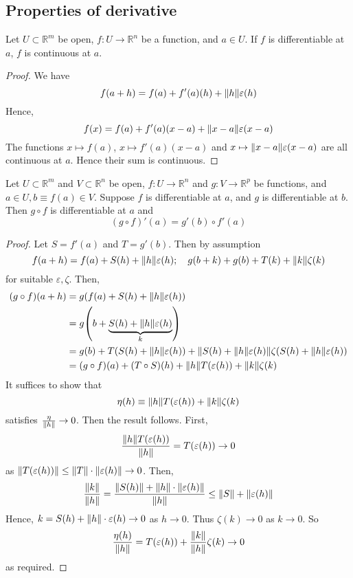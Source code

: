 \subsection{Properties of derivative}
\begin{proposition}
	Let \( U \subset \mathbb R^m \) be open, \( f \colon U \to \mathbb R^n \) be a function, and \( a \in U \).
	If \( f \) is differentiable at \( a \), \( f \) is continuous at \( a \).
\end{proposition}
\begin{proof}
	We have
	\[
		f(a+h) = f(a) + f'(a)(h) + \norm{h} \varepsilon(h)
	\]
	Hence,
	\[
		f(x) = f(a) + f'(a)(x-a) + \norm{x-a} \varepsilon(x-a)
	\]
	The functions \( x \mapsto f(a) \), \( x \mapsto f'(a)(x-a) \) and \( x \mapsto \norm{x-a}\varepsilon(x-a) \) are all continuous at \( a \).
	Hence their sum is continuous.
\end{proof}
\begin{proposition}
	Let \( U \subset \mathbb R^m \) and \( V \subset \mathbb R^n \) be open, \( f \colon U \to \mathbb R^n \) and \( g \colon V \to \mathbb R^p \) be functions, and \( a \in U, b \equiv f(a) \in V \).
	Suppose \( f \) is differentiable at \( a \), and \( g \) is differentiable at \( b \).
	Then \( g \circ f \) is differentiable at \( a \) and
	\[
		(g \circ f)'(a) = g'(b) \circ f'(a)
	\]
\end{proposition}
\begin{proof}
	Let \( S = f'(a) \) and \( T = g'(b) \).
	Then by assumption
	\[
		f(a+h) = f(a) + S(h) + \norm{h} \varepsilon(h);\quad g(b+k) + g(b) + T(k) + \norm{k} \zeta(k)
	\]
	for suitable \( \varepsilon, \zeta \).
	Then,
	\begin{align*}
		(g \circ f)(a+h) & = g\qty(f(a) + S(h) + \norm{h} \varepsilon(h))                                                                               \\
		                 & = g\qty(b + \underbrace{S(h) + \norm{h} \varepsilon(h)}_{k})                                                                 \\
		                 & = g(b) + T\qty(S(h) + \norm{h} \varepsilon(h)) + \norm{S(h) + \norm{h} \varepsilon(h)} \zeta(S(h) + \norm{h} \varepsilon(h)) \\
		                 & = (g \circ f)(a) + (T \circ S)(h) + \norm{h} T(\varepsilon(h)) + \norm{k} \zeta(k)
	\end{align*}
	It suffices to show that
	\[
		\eta(h) \equiv \norm{h} T(\varepsilon(h)) + \norm{k} \zeta(k)
	\]
	satisfies \( \frac{\eta}{\norm{h}} \to 0 \).
	Then the result follows.
	First,
	\[
		\frac{\norm{h}T(\varepsilon(h))}{\norm{h}} = T(\varepsilon(h)) \to 0
	\]
	as \( \norm{T(\varepsilon(h))} \leq \norm{T} \cdot \norm{\varepsilon(h)} \to 0 \).
	Then,
	\[
		\frac{\norm{k}}{\norm{h}} = \frac{\norm{S(h)} + \norm{h} \cdot \norm{\varepsilon(h)}}{\norm{h}} \leq \norm{S} + \norm{\varepsilon(h)}
	\]
	Hence, \( k = S(h) + \norm{h} \cdot \varepsilon(h) \to 0 \) as \( h \to 0 \).
	Thus \( \zeta(k) \to 0 \) as \( k \to 0 \).
	So
	\[
		\frac{\eta(h)}{\norm{h}} = T(\varepsilon(h)) + \frac{\norm{k}}{\norm{h}} \zeta(k) \to 0
	\]
	as required.
\end{proof}
